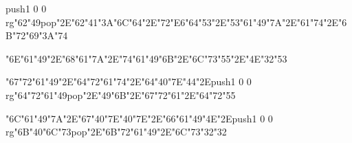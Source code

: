 \centerline{\pdfcolorstack\match push{1 0 0 rg}\ipa\char"62\ipa\char"49\pdfcolorstack\match pop{}\ipa\char"2E\ipa\char"62\ipa\char"41\ipa\char"3A\ipa\char"6C\ipa\char"64\ipa\char"2E\ipa\char"72\ipa\char"E6\ipa\char"64\ipa\char"53\ipa\char"2E\ipa\char"53\ipa\char"61\ipa\char"49\ipa\char"7A\ipa\char"2E\ipa\char"61\ipa\char"74\ipa\char"2E\ipa\char"6B\ipa\char"72\ipa\char"69\ipa\char"3A\ipa\char"74}
\vfill\eject
\null\vfill
\centerline{\ipa\char"6E\ipa\char"61\ipa\char"49\ipa\char"2E\ipa\char"68\ipa\char"61\ipa\char"7A\ipa\char"2E\ipa\char"74\ipa\char"61\ipa\char"49\ipa\char"6B\ipa\char"2E\ipa\char"6C\ipa\char"73\ipa\char"55\ipa\char"2E\ipa\char"4E\ipa\char"32\ipa\char"53}\bigskip
\centerline{\ipa\char"67\ipa\char"72\ipa\char"61\ipa\char"49\ipa\char"2E\ipa\char"64\ipa\char"72\ipa\char"61\ipa\char"74\ipa\char"2E\ipa\char"64\ipa\char"40\ipa\char"7E\ipa\char"44\ipa\char"2E\pdfcolorstack\match push{1 0 0 rg}\ipa\char"64\ipa\char"72\ipa\char"61\ipa\char"49\pdfcolorstack\match pop{}\ipa\char"2E\ipa\char"49\ipa\char"6B\ipa\char"2E\ipa\char"67\ipa\char"72\ipa\char"61\ipa\char"2E\ipa\char"64\ipa\char"72\ipa\char"55}\bigskip
\centerline{\ipa\char"6C\ipa\char"61\ipa\char"49\ipa\char"7A\ipa\char"2E\ipa\char"67\ipa\char"40\ipa\char"7E\ipa\char"40\ipa\char"7E\ipa\char"2E\ipa\char"66\ipa\char"61\ipa\char"49\ipa\char"4E\ipa\char"2E\pdfcolorstack\match push{1 0 0 rg}\ipa\char"6B\ipa\char"40\ipa\char"6C\ipa\char"73\pdfcolorstack\match pop{}\ipa\char"2E\ipa\char"6B\ipa\char"72\ipa\char"61\ipa\char"49\ipa\char"2E\ipa\char"6C\ipa\char"73\ipa\char"32\ipa\char"32}
\vfill\eject
\bye